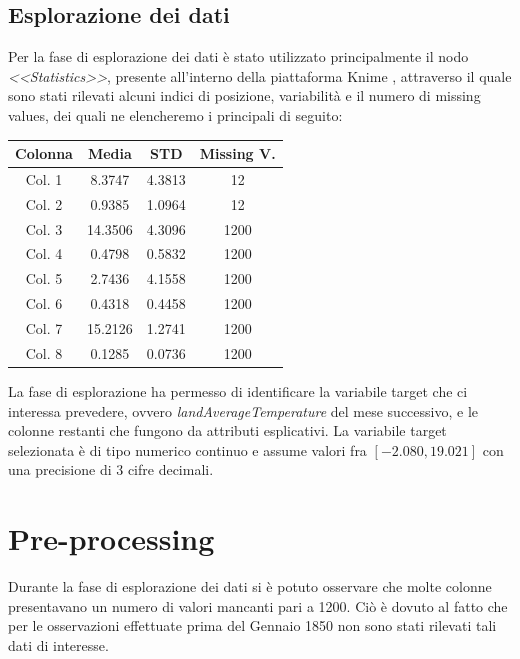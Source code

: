 \documentclass[12pt, a4paper, twocolumn]{article} %
\begin{document}
\subsection{Esplorazione dei dati}
Per la fase di esplorazione dei dati è stato utilizzato principalmente il nodo \textit{<<Statistics>>}, presente all'interno della piattaforma Knime \cite{knimewebsite}, attraverso il quale sono stati rilevati alcuni indici di posizione, variabilità e il numero di missing values, dei quali ne elencheremo i principali di seguito:
%
\begin{center}
\begin{tabular}{||c c c c||} 
 \hline
 Colonna  & Media & STD & Missing V. \\ [0.5ex] 
 \hline\hline
	Col. 1 &   8.3747 & 4.3813 & 12 \\
\hline\hline
	Col. 2 &   0.9385& 1.0964 & 12 \\
	\hline\hline
	Col. 3 & 14.3506 & 4.3096 & 1200 \\
	\hline\hline
	Col. 4 & 0.4798 & 0.5832 & 1200 \\
	\hline\hline
	Col. 5 &2.7436 & 4.1558 & 1200 \\
	\hline\hline
	Col. 6 & 0.4318 & 0.4458 & 1200 \\
	\hline\hline
	Col. 7 & 15.2126 & 1.2741 & 1200 \\
	\hline\hline
	Col. 8 & 0.1285 & 0.0736 & 1200 \\[0.5ex] \hline 
\end{tabular}
\end{center}

La fase di esplorazione ha permesso di identificare la variabile target che ci interessa prevedere, ovvero \textit{landAverageTemperature} del mese successivo, e le colonne restanti che fungono da attributi esplicativi.
La variabile target selezionata è di tipo numerico continuo e assume valori fra $[-2.080, 19.021]$ con una precisione di 3 cifre decimali.

\section{Pre-processing}
Durante la fase di esplorazione dei dati si è potuto osservare che molte colonne presentavano un numero di valori mancanti pari a 1200. Ciò è dovuto al fatto che per le osservazioni effettuate prima del Gennaio 1850 non sono stati rilevati tali dati di interesse. 
\end{document}
